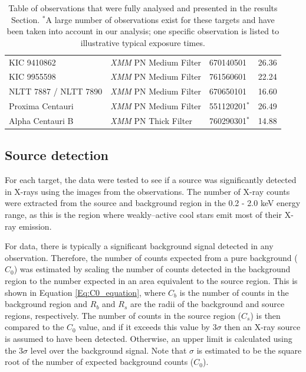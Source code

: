 \begin{table}[t]
{\begin{tabular}{lllc}
		KIC 9410862 & \textit{XMM} PN Medium Filter & 670140501 & 26.36\\
		KIC 9955598 & \textit{XMM} PN Medium Filter & 761560601 & 22.24 \\
		NLTT 7887 / NLTT 7890 & \textit{XMM} PN Medium Filter & 670650101 & 16.60  \\
		Proxima Centauri & \textit{XMM} PN Medium Filter & 551120201$^*$ & 26.49 \\
		Alpha Centauri B & \textit{XMM} PN Thick Filter & 760290301$^*$ & 14.88 \\     
		\hline
		\end{tabular}}
		\caption[List of X-ray observations used in study]{Table of observations that were fully analysed and presented in the results Section. $^*$A large number of observations exist for these targets and have been taken into account in our analysis; one specific observation is listed to illustrative typical exposure times.}
		\label{table:xray_obs_details}
\end{table}

\subsection{Source detection}
For each target, the data were tested to see if a source was significantly detected in X-rays using the images from the observations. The number of X-ray counts were extracted from the source and background region in the 0.2 - 2.0 keV energy range, as this is the region where weakly--active cool stars emit most of their X-ray emission.

For \XMM data, there is typically a significant background signal detected in any observation. Therefore, the number of counts expected from a pure background  ($C_{0}$) was estimated by scaling the number of counts detected in the background region to the number expected in an area equivalent to the source region. This is shown in Equation \ref{Eq:C0_equation}, where $C_{b}$ is the number of counts in the background region and $R_{b}$ and $R_{s}$ are the radii of the background and source regions, respectively. The number of counts in the source region ($C_{s}$) is then compared to the $C_{0}$ value, and if it exceeds this value by $3\sigma$ then an X-ray source is assumed to have been detected. Otherwise, an upper limit is calculated using the $3\sigma$ level over the background signal. Note that $\sigma$ is estimated to be the square root of the number of expected background counts ($C_{0}$). 

